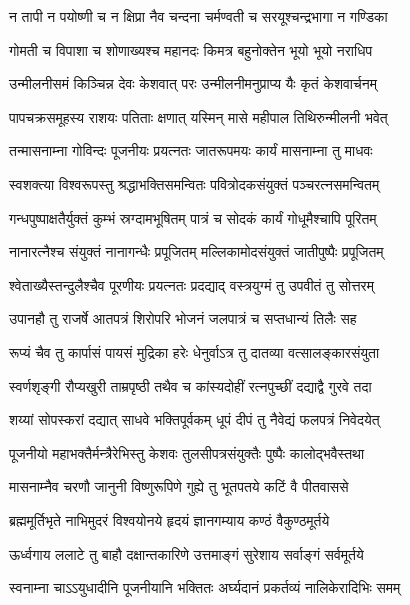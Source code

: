 \twolineshloka
{न तापी न पयोष्णी च न क्षिप्रा नैव चन्दना}
{चर्मण्वती च सरयूश्चन्द्रभागा न गण्डिका}%

\twolineshloka
{गोमती च विपाशा च शोणाख्यश्च महानदः}
{किमत्र बहुनोक्तेन भूयो भूयो नराधिप}%

\twolineshloka
{उन्मीलनीसमं किञ्चिन्न देवः केशवात् परः}
{उन्मीलनीमनुप्राप्य यैः कृतं केशवार्चनम्}%

\twolineshloka
{पापचक्रसमूहस्य राशयः पतिताः क्षणात्}
{यस्मिन् मासे महीपाल तिथिरुन्मीलनी भवेत्}%

\twolineshloka
{तन्मासनाम्ना गोविन्दः पूजनीयः प्रयत्नतः}
{जातरूपमयः कार्यं मासनाम्ना तु माधवः}%

\twolineshloka
{स्वशक्त्या विश्वरूपस्तु श्रद्धाभक्तिसमन्वितः}
{पवित्रोदकसंयुक्तं पञ्चरत्नसमन्वितम्}%

\twolineshloka
{गन्धपुष्पाक्षतैर्युक्तं कुम्भं स्रग्दामभूषितम्}
{पात्रं च सोदकं कार्यं गोधूमैश्चापि पूरितम्}%

\twolineshloka
{नानारत्नैश्च संयुक्तं नानागन्धैः प्रपूजितम्}
{मल्लिकामोदसंयुक्तं जातीपुष्पैः प्रपूजितम्}%

\twolineshloka
{श्वेताख्यैस्तन्दुलैश्चैव पूरणीयः प्रयत्नतः}
{प्रदद्याद् वस्त्रयुग्मं तु उपवीतं तु सोत्तरम्}%

\twolineshloka
{उपानहौ तु राजर्षे आतपत्रं शिरोपरि}
{भोजनं जलपात्रं च सप्तधान्यं तिलैः सह}%

\twolineshloka
{रूप्यं चैव तु कार्पासं पायसं मुद्रिका हरेः}
{धेनुर्वाऽत्र तु दातव्या वत्सालङ्कारसंयुता}%

\twolineshloka
{स्वर्णशृङ्गी रौप्यखुरी ताम्रपृष्ठी तथैव च}
{कांस्यदोहीं रत्नपुच्छीं दद्याद्वै गुरवे तदा}%

\twolineshloka
{शय्यां सोपस्करां दद्यात् साधवे भक्तिपूर्वकम्}
{धूपं दीपं तु नैवेद्यं फलपत्रं निवेदयेत्}%

\twolineshloka
{पूजनीयो महाभक्तैर्मन्त्रैरेभिस्तु केशवः}
{तुलसीपत्रसंयुक्तैः पुष्पैः कालोद्भवैस्तथा}%

\twolineshloka
{मासनाम्नैव चरणौ जानुनी विष्णुरूपिणे}
{गुह्ये तु भूतपतये कटिं वै पीतवाससे}%

\twolineshloka
{ब्रह्ममूर्तिभृते नाभिमुदरं विश्वयोनये}
{हृदयं ज्ञानगम्याय कण्ठं वैकुण्ठमूर्तये}%

\twolineshloka
{ऊर्ध्वगाय ललाटे तु बाहौ दक्षान्तकारिणे}
{उत्तमाङ्गं सुरेशाय सर्वाङ्गं सर्वमूर्तये}%

\twolineshloka
{स्वनाम्ना चाऽऽयुधादीनि पूजनीयानि भक्तितः}
{अर्घ्यदानं प्रकर्तव्यं नालिकेरादिभिः समम्}%

